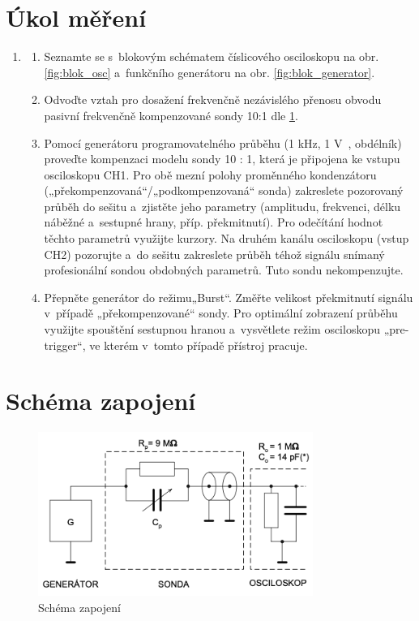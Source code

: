 \documentclass[a4paper,12pt]{article}   %
\begin{document}
\section{Úkol měření}
\label{chap:ukol}
\begin{enumerate}
    \item 
    \begin{enumerate}[label=\alph*)]
        \item Seznamte se s~blokovým schématem číslicového osciloskopu na obr. \ref{fig:blok_osc} a~funkčního generátoru na obr. \ref{fig:blok_generator}.
        \item  Odvoďte vztah pro dosažení frekvenčně nezávislého přenosu obvodu pasivní frekvenčně kompenzované sondy 10:1 dle \ref{fig:schema}.
        \item Pomocí generátoru programovatelného průběhu (1 kHz, 1 V~, obdélník) proveďte kompenzaci modelu sondy 10 : 1, která je připojena ke vstupu osciloskopu CH1. Pro obě mezní polohy proměnného kondenzátoru („překompenzovaná“/„podkompenzovaná“ sonda) zakreslete pozorovaný průběh do sešitu a~zjistěte jeho parametry (amplitudu, frekvenci, délku náběžné a~sestupné hrany, příp. překmitnutí). Pro odečítání hodnot těchto parametrů využijte kurzory.
        Na druhém kanálu osciloskopu (vstup CH2) pozorujte a~do sešitu zakreslete průběh téhož signálu snímaný profesionální sondou obdobných parametrů. Tuto sondu nekompenzujte.
        \item Přepněte generátor do režimu„Burst“. Změřte velikost překmitnutí signálu v~případě „překompenzované“ sondy. Pro optimální zobrazení průběhu využijte spouštění sestupnou hranou a~vysvětlete režim osciloskopu „pre-trigger“, ve kterém v~tomto případě přístroj pracuje.
    \end{enumerate}
\end{enumerate}


\section{Schéma zapojení}
\label{chap:schema_zapojeni}
\begin{figure}[h!]
  \centering
  \includegraphics[width = 0.8\textwidth]{schema_zapojeni.png}
  \caption{Schéma zapojení}
  \label{fig:schema}
\end{figure}
\end{document}
